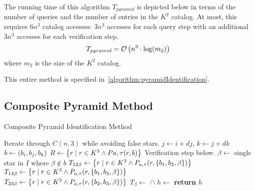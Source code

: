 The running time of this algorithm $T_{pyramid}$ is depicted below in terms of the number of queries and the number
of entries in the $K^2$ catalog.
At most, this requires $6n^3$ catalog accesses: $3n^3$ accesses for each query step with an additional $3n^3$ accesses
for each verification step.
\begin{equation}
    T_{pyramid} = \mathcal{O} \left( n^3 \cdot \log( m_2 ) \right)
\end{equation}
where $m_2$ is the size of the $K^2$ catalog.

This entire method is specified in~\autoref{algorithm:pyramidIdentification}.

\subsection{Composite Pyramid Method}\label{subsec:compositePyramidMethod}
\begin{algorithm}
    \caption{Composite Pyramid Identification Method}\label{algorithm:compositePyramid}
    \begin{algorithmic}[1]
        \LineComment Iterate through $C(n, 3)$ while avoiding false stars.
        \State $j \gets i + dj$, $k \gets j + dk$
        \State $b \gets (b_i, b_j, b_k)$
        \State $R \gets \left\{  r \mid r \in K^3 \land P{a, \tau}(r, b)  \right\}$
        \LineComment Verification step below.
        \State $\beta \gets $ single star in $I$ where $\beta \notin b$
        \State $T_{12\beta} \gets \left\{  r \mid r \in K^3 \land P_{a, \tau}(r, \left\{ b_1, b_2, \beta \right\}) \right\}$
        \State $T_{13\beta} \gets \left\{  r \mid r \in K^3 \land P_{a, \tau}(r, \left\{ b_1, b_3, \beta \right\}) \right\}$
        \State $T_{23\beta} \gets \left\{  r \mid r \in K^3 \land P_{a, \tau} (r, \left\{ b_2, b_3, \beta \right\}) \right\}$
        \State $T_\beta \gets $  $\cap$ 
        \State $h \gets$ 
        \invalidBijection
        \State \textbf{return} $h$
        \EndIf
        \EndIf
        \EndIf
        \EndFor
        \EndFor
        \EndFor
        \EndFunction
    \end{algorithmic}
\end{algorithm}

